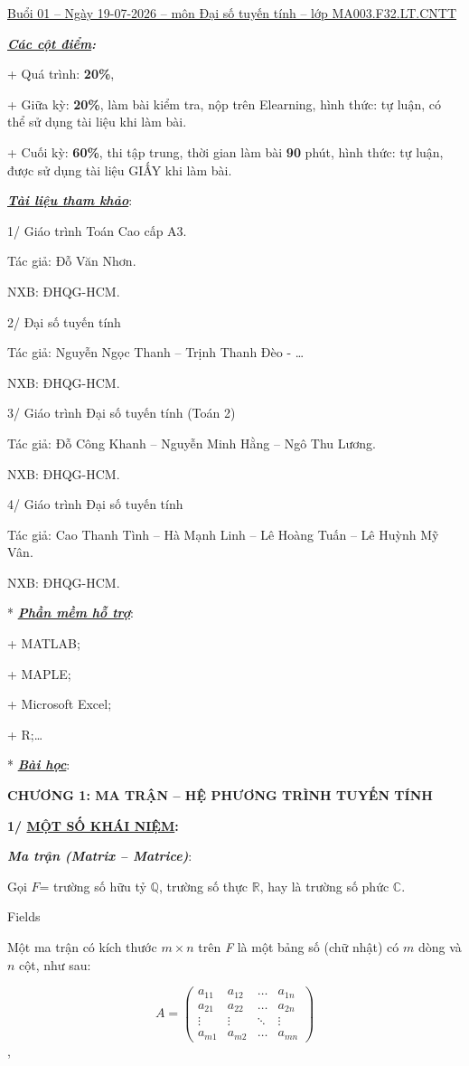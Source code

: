 \documentclass[12pt,a4paper]{article}
\let\ul\uline
\begin{document}
\ul{Buổi 01 -- Ngày 19-07-2026 -- môn Đại số tuyến tính -- lớp
MA003.F32.LT.CNTT}

\emph{\textbf{\ul{Các cột điểm}:}}

+ Quá trình: \textbf{20\%},

+ Giữa kỳ: \textbf{20\%}, làm bài kiểm tra, nộp trên Elearning, hình
thức: tự luận, có thể sử dụng tài liệu khi làm bài.

+ Cuối kỳ: \textbf{60\%}, thi tập trung, thời gian làm bài \textbf{90}
phút, hình thức: tự luận, được sử dụng tài liệu GIẤY khi làm bài.

\emph{\textbf{\ul{Tài liệu tham khảo}}}:

1/ Giáo trình Toán Cao cấp A3.

Tác giả: Đỗ Văn Nhơn.

NXB: ĐHQG-HCM.

2/ Đại số tuyến tính

Tác giả: Nguyễn Ngọc Thanh -- Trịnh Thanh Đèo - \ldots{}

NXB: ĐHQG-HCM.

3/ Giáo trình Đại số tuyến tính (Toán 2)

Tác giả: Đỗ Công Khanh -- Nguyễn Minh Hằng -- Ngô Thu Lương.

NXB: ĐHQG-HCM.

4/ Giáo trình Đại số tuyến tính

Tác giả: Cao Thanh Tình -- Hà Mạnh Linh -- Lê Hoàng Tuấn -- Lê Huỳnh Mỹ
Vân.

NXB: ĐHQG-HCM.

* \emph{\textbf{\ul{Phần mềm hỗ trợ}}}:

+ MATLAB;

+ MAPLE;

+ Microsoft Excel;

+ R;\ldots{}

* \emph{\textbf{\ul{Bài học}}}:

\textbf{CHƯƠNG 1: MA TRẬN -- HỆ PHƯƠNG TRÌNH TUYẾN TÍNH}

\textbf{1/ \ul{MỘT SỐ KHÁI NIỆM}:}

\emph{\textbf{Ma trận (Matrix -- Matrice)}}:

Gọi $F$= trường số hữu tỷ
$\mathbb{Q}$, trường số thực
$\mathbb{R}$, hay là trường số phức
$\mathbb{C}$.

Fields

Một ma trận có kích thước $m \times n$ trên
\emph{F} là một bảng số (chữ nhật) có $m$
dòng và $n$ cột, như sau:

$$A = \begin{pmatrix} a_{11} & a_{12} & \dots & a_{1n} \\ a_{21} & a_{22} & \dots & a_{2n} \\ \vdots & \vdots & \ddots & \vdots \\ a_{m1} & a_{m2} & \dots & a_{mn} \end{pmatrix}$$,
\end{document}
